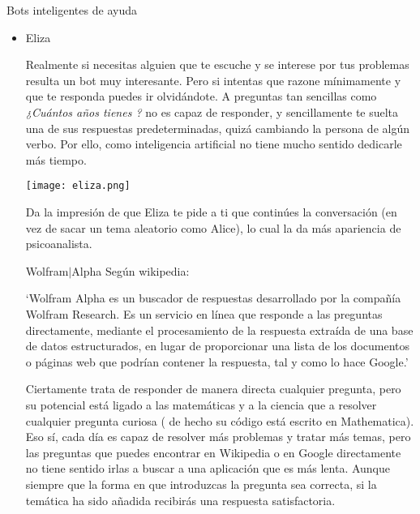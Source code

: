 \documentclass[spanish, a4paper, 12pt]{article} 	%
\begin{document}
\begin{section}{Bots inteligentes de ayuda}
\begin{itemize}
\begin{itemize}
			-judge: I have 99 problems 

			+ALICE: Let's think of a name for your problem, like "purple". Think of what it is like when you are purpling.
			
			(Parece que cuando llega a un punto muerto trata de cambiar el tema de conversación, eligiendo uno de una base de datos predeterminada.)
			
		\end{itemize}
	\newpage
		\item{Eliza}
		
	Realmente si necesitas alguien que te escuche y se interese por tus problemas resulta un bot muy interesante. Pero si intentas que razone mínimamente y que te responda puedes ir olvidándote. A preguntas tan sencillas como  \textit{¿Cuántos años tienes ?} no es capaz de responder, y sencillamente te suelta una de sus respuestas predeterminadas, quizá cambiando la persona de algún verbo. Por ello, como inteligencia artificial no tiene mucho sentido dedicarle más tiempo.
	
		\begin{center}
		\texttt{[image: eliza.png]}
		\end{center}	
	Da la impresión de que Eliza te pide a ti que continúes la conversación (en vez de sacar un tema aleatorio como Alice), lo cual la da más apariencia de psicoanalista.
	
	\newpage
\begin{section}{Wolfram$\vert$Alpha}
	Según wikipedia:
	
	`Wolfram Alpha  es un buscador de respuestas desarrollado por la compañía Wolfram Research. Es un servicio en línea que responde a las preguntas directamente, mediante el procesamiento de la respuesta extraída de una base de datos estructurados, en lugar de proporcionar una lista de los documentos o páginas web que podrían contener la respuesta, tal y como lo hace Google.'
	
	Ciertamente trata de responder de manera directa cualquier pregunta, pero su potencial está ligado a las matemáticas y a la ciencia que a resolver cualquier pregunta curiosa ( de hecho su código está escrito en Mathematica). Eso sí, cada día es capaz de resolver más problemas y tratar más temas, pero las preguntas que puedes encontrar en Wikipedia o en Google directamente no tiene sentido irlas a buscar a una aplicación que es más lenta.  Aunque siempre que la forma en que introduzcas la pregunta sea correcta, si la temática ha sido añadida recibirás una respuesta satisfactoria.
	

\end{section}
\end{itemize}
\end{section}
\end{document}
